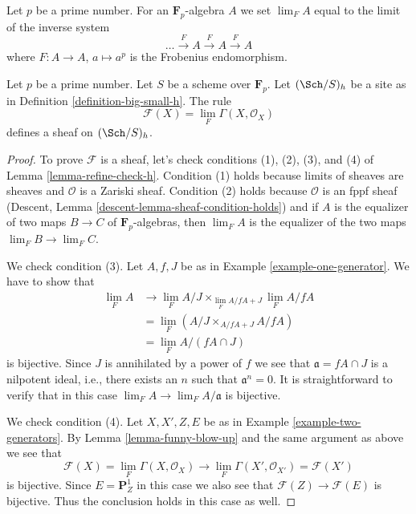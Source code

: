 \noindent
Let $p$ be a prime number. For an $\mathbf{F}_p$-algebra $A$
we set $\lim_F A$ equal to the limit of the inverse system
$$
\ldots \xrightarrow{F} A \xrightarrow{F} A \xrightarrow{F} A
$$
where $F : A \to A$, $a \mapsto a^p$ is the Frobenius endomorphism.

\begin{lemma}
\label{lemma-h-sheaf-lim-F}
Let $p$ be a prime number. Let $S$ be a scheme over $\mathbf{F}_p$.
Let $(\Sch/S)_h$ be a site as in Definition \ref{definition-big-small-h}.
The rule
$$
\mathcal{F}(X) = \lim_F \Gamma(X, \mathcal{O}_X)
$$
defines a sheaf on $(\Sch/S)_h$.
\end{lemma}

\begin{proof}
To prove $\mathcal{F}$ is a sheaf, let's check conditions
(1), (2), (3), and (4) of Lemma \ref{lemma-refine-check-h}.
Condition (1) holds because limits of sheaves are sheaves
and $\mathcal{O}$ is a Zariski sheaf. Condition (2) holds because
$\mathcal{O}$ is an fppf sheaf (Descent, Lemma
\ref{descent-lemma-sheaf-condition-holds}) and if $A$ is the equalizer
of two maps $B \to C$ of $\mathbf{F}_p$-algebras, then $\lim_F A$
is the equalizer of the two maps $\lim_F B \to \lim_F C$.

\medskip\noindent
We check condition (3). Let $A, f, J$ be as in
Example \ref{example-one-generator}.
We have to show that
\begin{align*}
\lim_F A
& \to
\lim_F A/J \times_{\lim_F A/fA + J} \lim_F A/fA \\
& =
\lim_F (A/J \times_{A/fA + J} A/fA) \\
& =
\lim_F A/(fA \cap J)
\end{align*}
is bijective. Since $J$ is annihilated by a power of $f$ we see that
$\mathfrak a = fA \cap J$ is a nilpotent ideal, i.e., there exists an
$n$ such that $\mathfrak a^n = 0$. It is straightforward
to verify that in this case $\lim_F A \to \lim_F A/\mathfrak a$
is bijective.

\medskip\noindent
We check condition (4). Let $X, X', Z, E$ be as in
Example \ref{example-two-generators}. By
Lemma \ref{lemma-funny-blow-up} and the same argument as above
we see that
$$
\mathcal{F}(X) = \lim_F \Gamma(X, \mathcal{O}_X)
\longrightarrow
\lim_F \Gamma(X', \mathcal{O}_{X'}) = \mathcal{F}(X')
$$
is bijective. Since $E = \mathbf{P}^1_Z$ in this case we also
see that $\mathcal{F}(Z) \to \mathcal{F}(E)$ is bijective.
Thus the conclusion holds in this case as well.
\end{proof}

